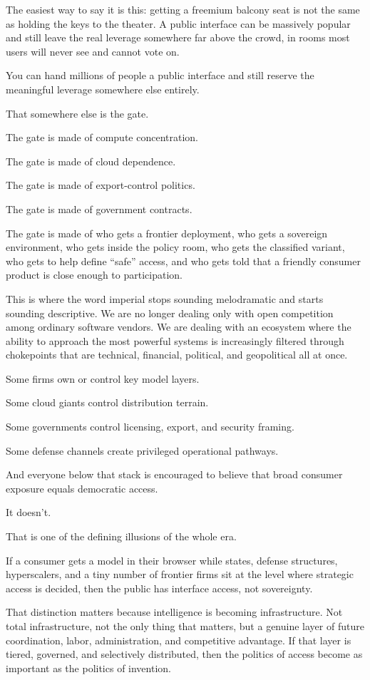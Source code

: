 \documentclass[
  american,
  12pt,
  letterpaper,
]{article}
\begin{document}
The easiest way to say it is this: getting a freemium balcony seat is
not the same as holding the keys to the theater. A public interface can
be massively popular and still leave the real leverage somewhere far
above the crowd, in rooms most users will never see and cannot vote on.

You can hand millions of people a public interface and still reserve the
meaningful leverage somewhere else entirely.

That somewhere else is the gate.

The gate is made of compute concentration.

The gate is made of cloud dependence.

The gate is made of export-control politics.

The gate is made of government contracts.

The gate is made of who gets a frontier deployment, who gets a sovereign
environment, who gets inside the policy room, who gets the classified
variant, who gets to help define ``safe'' access, and who gets told that
a friendly consumer product is close enough to participation.

This is where the word imperial stops sounding melodramatic and starts
sounding descriptive. We are no longer dealing only with open
competition among ordinary software vendors. We are dealing with an
ecosystem where the ability to approach the most powerful systems is
increasingly filtered through chokepoints that are technical, financial,
political, and geopolitical all at once.

Some firms own or control key model layers.

Some cloud giants control distribution terrain.

Some governments control licensing, export, and security framing.

Some defense channels create privileged operational pathways.

And everyone below that stack is encouraged to believe that broad
consumer exposure equals democratic access.

It doesn't.

That is one of the defining illusions of the whole era.

If a consumer gets a model in their browser while states, defense
structures, hyperscalers, and a tiny number of frontier firms sit at the
level where strategic access is decided, then the public has interface
access, not sovereignty.

That distinction matters because intelligence is becoming
infrastructure. Not total infrastructure, not the only thing that
matters, but a genuine layer of future coordination, labor,
administration, and competitive advantage. If that layer is tiered,
governed, and selectively distributed, then the politics of access
become as important as the politics of invention.
\end{document}
